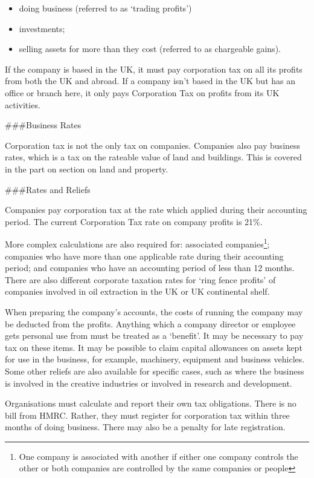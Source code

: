 \documentclass[]{tufte-handout}
\providecommand{\tightlist}{%
  \setlength{\itemsep}{0pt}\setlength{\parskip}{0pt}}
\begin{document}
\begin{itemize}
\tightlist
\item
  doing business (referred to as `trading profits')
\item
  investments;
\item
  selling assets for more than they cost (referred to as chargeable
  gains).
\end{itemize}

If the company is based in the UK, it must pay corporation tax on all
its profits from both the UK and abroad. If a company isn't based in the
UK but has an office or branch here, it only pays Corporation Tax on
profits from its UK activities.

\#\#\#Business Rates

Corporation tax is not the only tax on companies. Companies also pay
business rates, which is a tax on the rateable value of land and
buildings. This is covered in the part on section on land and property.

\#\#\#Rates and Reliefs

Companies pay corporation tax at the rate which applied during their
accounting period. The current Corporation Tax rate on company profits
is 21\%.

More complex calculations are also required for: associated
companies\footnote{One company is associated with another if either one
  company controls the other or both companies are controlled by the
  same companies or people}; companies who have more than one applicable
rate during their accounting period; and companies who have an
accounting period of less than 12 months. There are also different
corporate taxation rates for `ring fence profits' of companies involved
in oil extraction in the UK or UK continental shelf.

When preparing the company's accounts, the costs of running the company
may be deducted from the profits. Anything which a company director or
employee gets personal use from must be treated as a `benefit'. It may
be necessary to pay tax on these items. It may be possible to claim
capital allowances on assets kept for use in the business, for example,
machinery, equipment and business vehicles. Some other reliefs are also
available for specific cases, such as where the business is involved in
the creative industries or involved in research and development.

Organisations must calculate and report their own tax obligations. There
is no bill from HMRC. Rather, they must register for corporation tax
within three months of doing business. There may also be a penalty for
late registration.
\end{document}
